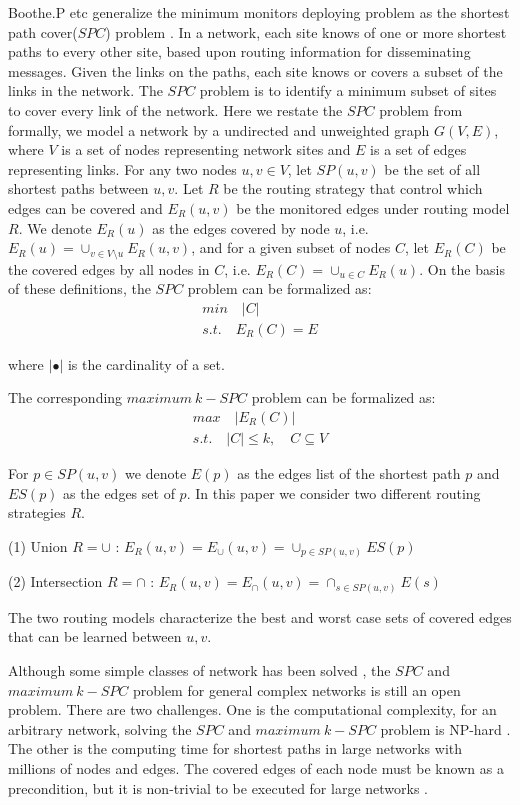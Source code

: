 \documentclass[review]{elsarticle}
\begin{document}
Boothe.P etc generalize the minimum monitors deploying problem as the shortest path cover($SPC$) problem \cite{boothe2007graph}. In a network, each site knows of one or more shortest paths to every other site, based upon routing information for disseminating messages. Given the links on the paths, each site knows or covers a subset of the links in the network. The $SPC$ problem is to identify a minimum subset of sites to cover every link of the network. Here we restate the $SPC$ problem from \cite{boothe2007graph,pignolet2017tomographic} formally,  we model a network by a undirected and unweighted graph $G(V,E)$, where $V$ is a set of nodes representing network sites and $E$ is a set of  edges representing links. For any two nodes $u,v \in V $, let $SP(u,v)$ be the set of all shortest paths between $u,v$. Let $R$ be the routing strategy that control which edges can be covered and $E_R(u,v)$ be the monitored edges under routing model $R$. We denote $E_R(u)$ as the edges covered by node $u$, i.e. $E_R(u)=\cup_{v \in V \setminus u}E_R(u,v)$, and for a given subset of nodes $C$, let $E_R(C)$ be the covered edges by all nodes in $C$,  i.e. $E_R(C)=\cup_{u \in C} E_R(u)$. On the basis of these definitions, the $SPC$ problem can be formalized as:
\begin{gather*}
min    \quad \lvert C \lvert \\
s.t.   \quad E_R(C)=E
\end{gather*}

where $\lvert \bullet \rvert$ is the cardinality of a set.

The corresponding $maximum \  k-SPC$ problem can be formalized as:
\begin{gather*}
max   \quad   \lvert E_R(C) \rvert \\
s.t.  \quad \lvert C \rvert \leq k, \quad C \subseteq V
\end{gather*}

For $p \in SP(u,v)$ we denote $E(p)$ as the edges list of the shortest path $p$ and $ES(p)$ as the edges set of $p$. In this paper we consider two different routing strategies $R$.

(1) Union $R=\cup$ : $E_R(u,v)=E_{\cup}(u,v)=\cup_{p \in SP(u,v)}ES(p)$

(2) Intersection $R=\cap$ :  $E_R(u,v)=E_{\cap}(u,v)=\cap_{s \in SP(u,v)}E(s)$

The two routing models characterize the best and worst case sets of covered edges that can be learned between $u,v$.

Although some simple classes of network has been solved \cite{boothe2007graph,pignolet2017tomographic}, the $SPC$ and $maximum \  k-SPC$ problem for general complex networks is still an open problem. There are two challenges. One is the computational complexity, for an arbitrary network, solving the $SPC$ and $maximum \  k-SPC$ problem is NP-hard \cite{boothe2007graph}. The other is the computing time for shortest paths in large networks with millions of nodes and edges. The covered edges of each node must be known as a precondition, but it is non-trivial to be executed for large networks \cite{gubichev2010fast,akiba2012shortest,madkour2017survey,panda2018survey}.
\end{document}

